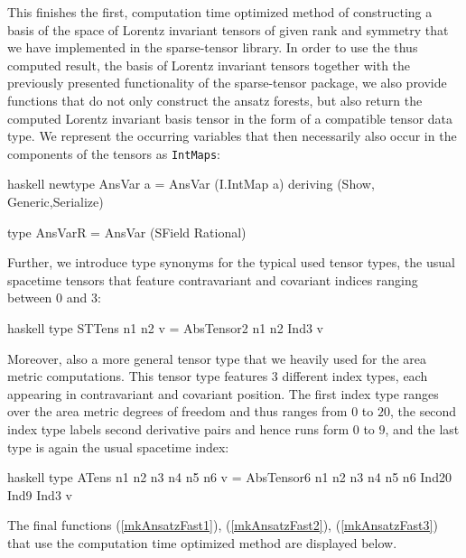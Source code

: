 This finishes the first, computation time optimized method of constructing a basis of the space of Lorentz invariant tensors of given rank and symmetry that we have implemented in the sparse-tensor library. In order to use the thus computed result, the basis of Lorentz invariant tensors together with the previously presented functionality of the sparse-tensor package, we also provide functions that do not only construct the ansatz forests, but also return the computed Lorentz invariant basis tensor in the form of a compatible tensor data type. We represent the occurring variables that then necessarily also occur in the components of the tensors as \texttt{IntMaps}:
\begin{center}
\begin{cminted}{haskell}
newtype AnsVar a = AnsVar (I.IntMap a) deriving (Show, Generic,Serialize)

type AnsVarR = AnsVar (SField Rational)
\end{cminted}
\end{center}
Further, we introduce type synonyms for the typical used tensor types, the usual spacetime tensors that feature contravariant and covariant indices ranging between $0$ and $3$:
\begin{center}
\begin{cminted}{haskell}
type STTens n1 n2 v = AbsTensor2 n1 n2 Ind3 v
\end{cminted}
\end{center}
Moreover, also a more general tensor type that we heavily used for the area metric computations. This tensor type features 3 different index types, each appearing in contravariant and covariant position. The first index type ranges over the area metric degrees of freedom and thus ranges from $0$ to $20$, the second index type labels second derivative pairs and hence runs form $0$ to $9$, and the last type is again the usual spacetime index:
\begin{center}
\begin{cminted}{haskell}
type ATens n1 n2 n3 n4 n5 n6 v = 
     AbsTensor6 n1 n2 n3 n4 n5 n6 Ind20 Ind9 Ind3 v
\end{cminted}
\end{center}
The final functions (\ref{mkAnsatzFast1}), (\ref{mkAnsatzFast2}), (\ref{mkAnsatzFast3}) that use the computation time optimized method are displayed below.

